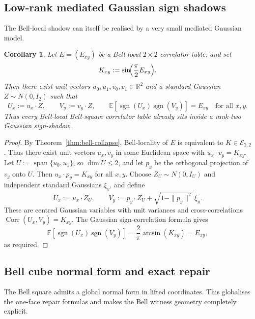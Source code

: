 \documentclass[11pt]{article}
\numberwithin{equation}{section}
\theoremstyle{thmcompact}
\newtheorem{corollary}[theorem]{Corollary}
\theoremstyle{remark}
\begin{document}
\subsection{Low-rank mediated Gaussian sign shadows}

The Bell-local shadow can itself be realised by a very small mediated Gaussian model.

\begin{corollary}\label{cor:rank-two-sign-shadow}
Let $E=(E_{xy})$ be a Bell-local $2\times2$ correlator table, and set
\[
K_{xy}:=\sin\!\Bigl(\frac{\pi}{2}E_{xy}\Bigr).
\]
Then there exist unit vectors $u_0,u_1,v_0,v_1\in\mathbb R^2$ and a standard Gaussian $Z\sim N(0,I_2)$ such that
\[
U_x:=u_x\cdot Z,
\qquad
V_y:=v_y\cdot Z,
\qquad
\mathbb E[\operatorname{sgn}(U_x)\operatorname{sgn}(V_y)]=E_{xy}
\quad\text{for all }x,y.
\]
Thus every Bell-local Bell-square correlator table already sits inside a rank-two Gaussian sign-shadow.
\end{corollary}

\begin{proof}
By Theorem~\ref{thm:bell-collapse}, Bell-locality of $E$ is equivalent to $K\in\mathcal E_{2,2}$. Thus there exist unit vectors $u_x,v_y$ in some Euclidean space with $u_x\cdot v_y=K_{xy}$. Let $U:=\operatorname{span}\{u_0,u_1\}$, so $\dim U\le 2$, and let $p_y$ be the orthogonal projection of $v_y$ onto $U$. Then $u_x\cdot p_y=K_{xy}$ for all $x,y$. Choose $Z_U\sim N(0,I_U)$ and independent standard Gaussians $\xi_y$, and define
\[
U_x:=u_x\cdot Z_U,
\qquad
V_y:=p_y\cdot Z_U+\sqrt{1-\|p_y\|^2}\,\xi_y.
\]
These are centred Gaussian variables with unit variances and cross-correlations $\operatorname{Corr}(U_x,V_y)=K_{xy}$. The Gaussian sign-correlation formula gives
\[
\mathbb E[\operatorname{sgn}(U_x)\operatorname{sgn}(V_y)]
=\frac{2}{\pi}\arcsin(K_{xy})
=E_{xy},
\]
as required.
\end{proof}

\subsection{Bell cube normal form and exact repair}

The Bell square admits a global normal form in lifted coordinates. This globalises the one-face repair formulas and makes the Bell witness geometry completely explicit.
\end{document}
